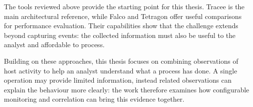 The tools reviewed above provide the starting point for this thesis.
Tracee is the main architectural reference, while Falco and Tetragon
offer useful comparisons for performance evaluation.
Their capabilities show that the challenge extends beyond capturing
events: the collected information must also be useful to the analyst
and affordable to process.

Building on these approaches, this thesis focuses on combining observations
of host activity to help an analyst understand what a process has done.
A single operation may provide limited information, instead related
observations can explain the behaviour more clearly: the work therefore
examines how configurable monitoring and correlation can bring this
evidence together.
